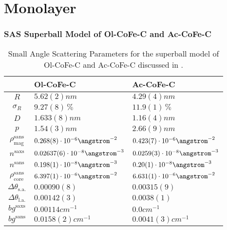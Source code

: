\documentclass[\main/dresen_thesis.tex]{subfiles}
\begin{document}
\section{Monolayer}
\subsubsection{SAS Superball Model of Ol-CoFe-C and Ac-CoFe-C}\label{ch:appendix:modelparameters:monolayers:sas_olac_cofe_c}
  \begin{table}[h]
    \centering
    \caption{\label{tab:appendix:modelparamters:monolayers:nanoparticle:sas}Small Angle Scattering Parameters for the superball model of Ol-CoFe-C and Ac-CoFe-C discussed in .}
    \begin{tabular}{ c | l | l }
        & Ol-CoFe-C & Ac-CoFe-C \\
      \hline
      $R$
        & $5.62(2) \unit{nm}$
        & $4.29(4) \unit{nm}$\\
      $\sigma_R$
        & $9.27(8) \,\%$
        & $11.9(1) \,\%$\\
      $D$
        & $1.633(8) \unit{nm}$
        & $1.16(4) \unit{nm}$\\
      $p$
        & $1.54(3) \unit{nm}$
        & $2.66(9) \unit{nm}$\\
      $\rho_\mathrm{mag}^\mathrm{sans}$
        & $0.268(8) \cdot 10^{-6} \angstrom^{-2}$
        & $0.423(7) \cdot 10^{-6} \angstrom^{-2}$\\
      \hline
      $n^\mathrm{saxs}$
        & $0.02637(6) \cdot 10^{-8} \angstrom^{-3}$
        & $0.0259(3) \cdot 10^{-8} \angstrom^{-3}$\\
      $n^\mathrm{sans}$
        & $0.198(1) \cdot 10^{-8} \angstrom^{-3}$
        & $0.20(1) \cdot 10^{-8} \angstrom^{-3}$\\
      $\rho_\mathrm{core}^\mathrm{sans}$
        & $6.397(1) \cdot 10^{-6} \angstrom^{-2}$
        & $6.631(1) \cdot 10^{-6} \angstrom^{-2}$\\
      $\Delta \theta_\mathrm{s. a.}$
        & $0.00090(8)$
        & $0.00315(9)$\\
      $\Delta \theta_\mathrm{l. a.}$
        & $0.00142(3)$
        & $0.0038(1)$\\
      $bg^\mathrm{saxs}$
        & $0.00114 \unit{cm}^{-1}$
        & $0.0 \unit{cm}^{-1}$\\
      $bg^\mathrm{sans}$
        & $0.0158(2) \unit{cm}^{-1}$
        & $0.0041(3) \unit{cm}^{-1}$\\

\end{tabular}
\end{table}
\end{document}
